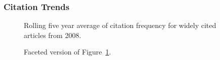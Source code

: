 \documentclass[
  10pt,
  letterpaper,
  DIV=11,
  numbers=noendperiod,
  twoside]{scrartcl}
\begin{document}
\subsubsection*{Citation Trends}\label{sec-trends-2008}

\begin{figure}


\caption{\label{fig-citation-spaghetti-2008}Rolling five year average of
citation frequency for widely cited articles from 2008.}

\end{figure}%

\begin{figure}


\caption{\label{fig-citation-facet-2008}Faceted version of
Figure~\ref{fig-citation-spaghetti-2008}.}

\end{figure}%
\end{document}
